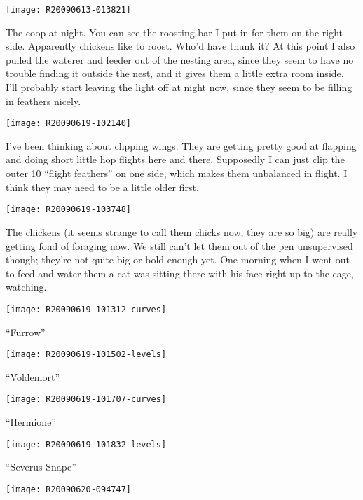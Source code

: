 \texttt{[image: R20090613-013821]}

The coop at night.  You can see the roosting bar I put in for them on
the right side.  Apparently chickens like to roost.  Who'd have thunk
it?  At this point I also pulled the waterer and feeder out of the
nesting area, since they seem to have no trouble finding it outside the
nest, and it gives them a little extra room inside.  I'll probably start
leaving the light off at night now, since they seem to be filling in
feathers nicely. 
\newpage

\texttt{[image: R20090619-102140]}

I've been thinking about clipping wings.  They are getting pretty good
at flapping and doing short little hop flights here and there.
Supposedly I can just clip the outer 10 ``flight feathers'' on one side,
which makes them unbalanced in flight.  I think they may need to be a
little older first. 
\newpage

\texttt{[image: R20090619-103748]}

The chickens (it seems strange to call them chicks now, they are so big)
are really getting fond of foraging now.  We still can't let them out of
the pen unsupervised though; they're not quite big or bold enough yet.
One morning when I went out to feed and water them a cat was sitting
there with his face right up to the cage, watching. 
\newpage

\texttt{[image: R20090619-101312-curves]}

\begin{center}{\Large ``Furrow'' }\end{center}
\newpage

\texttt{[image: R20090619-101502-levels]}

\begin{center}{\Large ``Voldemort'' }\end{center}
\newpage

\texttt{[image: R20090619-101707-curves]}

\begin{center}{\Large ``Hermione'' }\end{center}
\newpage

\texttt{[image: R20090619-101832-levels]}

\begin{center}{\Large ``Severus Snape'' }\end{center}
\newpage

\texttt{[image: R20090620-094747]}

